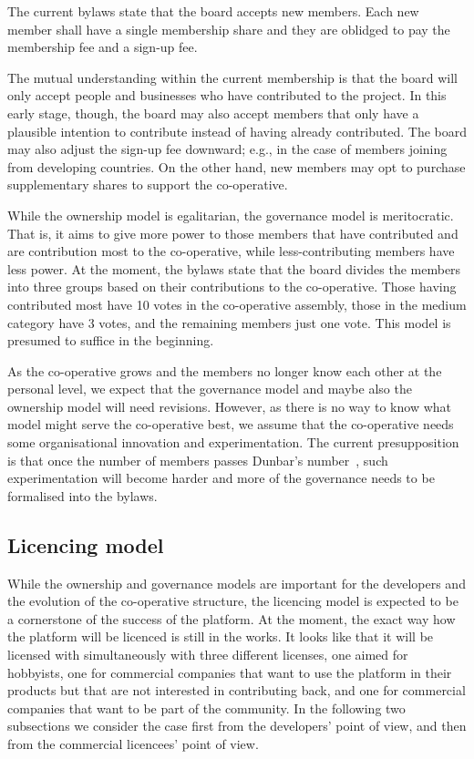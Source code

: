 \documentclass[draft,a4paper]{siamltex}
\begin{document}
The current bylaws state that the board accepts new members.  Each new
member shall have a single membership share and they are oblidged to
pay the membership fee and a sign-up fee.

The mutual understanding within the current membership is that the
board will only accept people and businesses who have contributed to
the project.  In this early stage, though, the board may also accept
members that only have a plausible intention to contribute instead of
having already contributed.  The board may also adjust the sign-up fee
downward; e.g., in the case of members joining from developing
countries.   On the other hand, new members may opt to purchase
supplementary shares to support the co-operative.

While the ownership model is egalitarian, the governance model is
meritocratic.  That is, it aims to give more power to those members
that have contributed and are contribution most to the co-operative,
while less-contributing members have less power.  At the moment, the
bylaws state that the board divides the members into three groups
based on their contributions to the co-operative.  Those having
contributed most have 10 votes in the co-operative assembly, those in
the medium category have 3 votes, and the remaining members just one
vote.  This model is presumed to suffice in the beginning.

As the co-operative grows and the members no longer know each other at
the personal level, we expect that the governance model and maybe also
the ownership model will need revisions.  However, as there is no way
to know what model might serve the co-operative best, we assume that
the co-operative needs some organisational innovation and
experimentation.  The current presupposition is that once the number
of members passes Dunbar's number~\cite{reference-needed}, such
experimentation will become harder and more of the governance needs to
be formalised into the bylaws.

\subsection{Licencing model}
\label{ssec:licencing}

While the ownership and governance models are important for the
developers and the evolution of the co-operative structure, the
licencing model is expected to be a cornerstone of the success of the
platform.  At the moment, the exact way how the platform will be
licenced is still in the works.  It looks like that it will be
licensed with simultaneously with three different licenses, one aimed
for hobbyists, one for commercial companies that want to use the
platform in their products but that are not interested in contributing
back, and one for commercial companies that want to be part of the
community.  In the following two subsections we consider the case
first from the developers' point of view, and then from the commercial
licencees' point of view.
\end{document}
